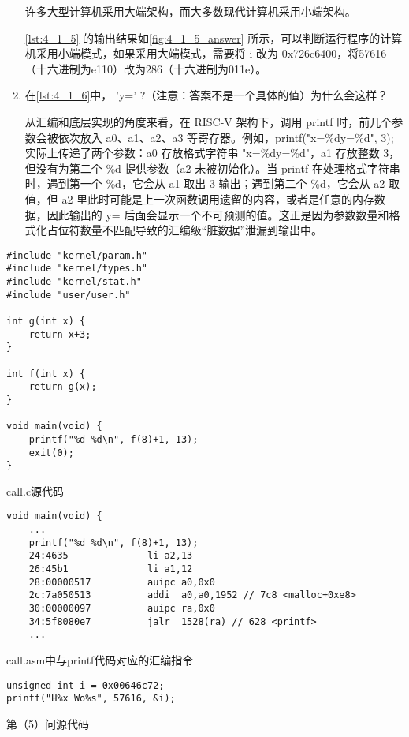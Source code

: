 \begin{enumerate}
	许多大型计算机采用大端架构，而大多数现代计算机采用小端架构。
	
	\cref{lst:4_1_5} 的输出结果如\cref{fig:4_1_5_answer} 所示，可以判断运行程序的计算机采用小端模式，如果采用大端模式，需要将 i 改为 0x726c6400，将57616（十六进制为e110）改为286（十六进制为011e）。
	
	\item 在\cref{lst:4_1_6}中， 'y=' ?（注意：答案不是一个具体的值）为什么会这样？
	
	从汇编和底层实现的角度来看，在 RISC-V 架构下，调用 printf 时，前几个参数会被依次放入 a0、a1、a2、a3 等寄存器。例如，printf("x=\%dy=\%d", 3); 实际上传递了两个参数：a0 存放格式字符串 "x=\%dy=\%d"，a1 存放整数 3，但没有为第二个 \%d 提供参数（a2 未被初始化）。当 printf 在处理格式字符串时，遇到第一个 \%d，它会从 a1 取出 3 输出；遇到第二个 \%d，它会从 a2 取值，但 a2 里此时可能是上一次函数调用遗留的内容，或者是任意的内存数据，因此输出的 y= 后面会显示一个不可预测的值。这正是因为参数数量和格式化占位符数量不匹配导致的汇编级“脏数据”泄漏到输出中。
	
\end{enumerate}

\begin{listing}[!htb]
	\begin{verbatim}
#include "kernel/param.h"
#include "kernel/types.h"
#include "kernel/stat.h"
#include "user/user.h"

int g(int x) {
    return x+3;
}

int f(int x) {
    return g(x);
}

void main(void) {
    printf("%d %d\n", f(8)+1, 13);
    exit(0);
}
	\end{verbatim}
	\caption{call.c源代码}\label{lst:call.c}
\end{listing}

\begin{listing}[!htb]
	\begin{verbatim}
void main(void) {
    ...
    printf("%d %d\n", f(8)+1, 13);
    24:4635              li a2,13
    26:45b1              li a1,12
    28:00000517          auipc a0,0x0
    2c:7a050513          addi  a0,a0,1952 // 7c8 <malloc+0xe8>
    30:00000097          auipc ra,0x0
    34:5f8080e7          jalr  1528(ra) // 628 <printf>
    ...
	\end{verbatim}
	\caption{call.asm中与printf代码对应的汇编指令}\label{lst:call_printf}
\end{listing}

\begin{listing}[!htb]
	\begin{verbatim}
unsigned int i = 0x00646c72;
printf("H%x Wo%s", 57616, &i);
	\end{verbatim}
	\caption{第（5）问源代码}\label{lst:4_1_5}
\end{listing}

